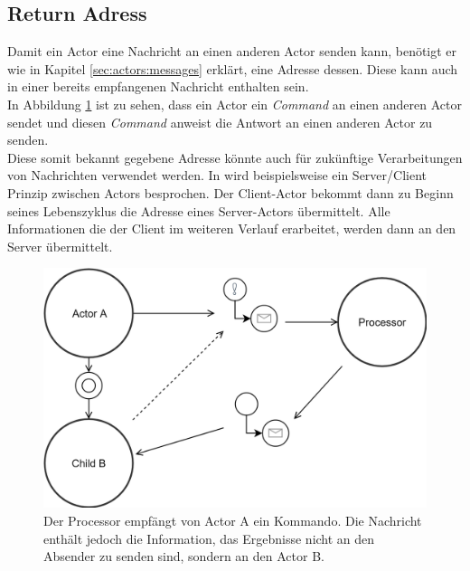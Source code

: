 
\subsection{Return Adress}
Damit ein Actor eine Nachricht an einen anderen Actor senden kann, benötigt er wie in Kapitel \ref{sec:actors:messages} erklärt, eine Adresse dessen. Diese kann auch in einer bereits empfangenen Nachricht enthalten sein. \\
In Abbildung \ref{fig:actor:patterns:returnAdress} ist zu sehen, dass ein Actor ein \textit{Command} an einen anderen Actor sendet und diesen \textit{Command} anweist die Antwort an einen anderen Actor zu senden. \\
Diese somit bekannt gegebene Adresse könnte auch für zukünftige Verarbeitungen von Nachrichten verwendet werden. In \cite{Vernon2015ReactiveAkka} wird beispielsweise ein Server/Client Prinzip zwischen Actors besprochen. Der Client-Actor bekommt dann zu Beginn seines Lebenszyklus die Adresse eines Server-Actors übermittelt. Alle Informationen die der Client im weiteren Verlauf erarbeitet, werden dann an den Server übermittelt.

\begin{figure}
  \centering
  \includegraphics[width=\linewidth]{gfx/actor/patterns/returnAddress}
  \caption{Der Processor empfängt von Actor A ein Kommando. Die Nachricht enthält jedoch die Information, das Ergebnisse nicht an den Absender zu senden sind, sondern an den Actor B.}
  \label{fig:actor:patterns:returnAdress}
\end{figure}


